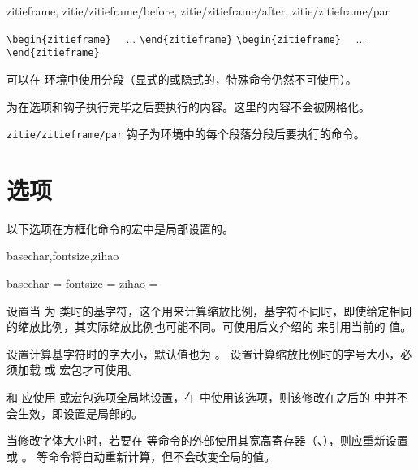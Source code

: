 \documentclass{ctxdoc}
\begin{document}
\begin{function}{zitieframe,
  zitie/zitieframe/before, zitie/zitieframe/after,
  zitie/zitieframe/par
}
  \begin{syntax}
    \verb|\begin{zitieframe}| 
    ~~...
    \verb|\end{zitieframe}|
    \verb|\begin{zitieframe}|  
    ~~...
    \verb|\end{zitieframe}|
  \end{syntax}
  可以在  环境中使用分段（显式的或隐式的，特殊命令仍然不可使用）。

   为在选项和钩子执行完毕之后要执行的内容。这里的内容不会被网格化。

  \verb|zitie/zitieframe/par| 钩子为环境中的每个段落分段后要执行的命令。
\end{function}

\section{选项}\label{sec:options}

以下选项在方框化命令的宏中是局部设置的。

\begin{function}{basechar,fontsize,zihao}
  \begin{syntax}
    basechar =  
    fontsize =  \init{\normalsize}
    zihao = 
  \end{syntax}
   设置当  为  类时的基字符，这个用来计算缩放比例，基字符不同时，即使给定相同的缩放比例，其实际缩放比例也可能不同。可使用后文介绍的  来引用当前的  值。

   设置计算基字符时的字大小，默认值也为 。 设置计算缩放比例时的字号大小，必须加载  或  宏包才可使用。

   和  应使用  或宏包选项全局地设置，在  中使用该选项，则该修改在之后的  中并不会生效，即设置是局部的。

  当修改字体大小时，若要在  等命令的外部使用其宽高寄存器（、），则应重新设置  或 。 等命令将自动重新计算，但不会改变全局的值。
\end{function}
\end{document}
